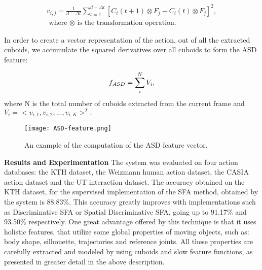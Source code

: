 \documentclass[11pt]{report}
\begin{document}
 \begin{equation}
 \begin{multlined}
 v_{i,j} = \frac{1}{d-\Delta t} \sum_{t = 1}^{d-\Delta t}[C_i(t+1) \otimes F_j - C_i(t) \otimes F_j]^2,\\ 
 \text{ where } \otimes \text{ is the transformation operation. } 
 \end{multlined}
 \end{equation}
 
In order to create a vector representation of the action, out of all the extracted cuboids, we accumulate the squared derivatives over all cuboids to form the ASD feature:

\begin{equation}
\mathnormal{f}_{ASD} = \sum_i^N V_i,
\end{equation}
where N is the total number of cuboids extracted from the current frame and \(V_i = <v_{i,1}, v_{i,2}, ..., v_{i,K}>^T.\)

\begin{figure}
    \centering
    \texttt{[image: ASD-feature.png]}
    \caption{An example of the computation of the ASD feature vector.} 
    \label{fig:ASD-feature}
\end{figure}

\textbf{Results and Experimentation}
The system was evaluated on four action databases: the KTH dataset, the Weizmann human action dataset, the CASIA action dataset and the UT interaction dataset. The accuracy obtained on the KTH dataset, for the supervised implementation of the SFA method, obtained by the system is 88.83\%. This accuracy greatly improves with implementations such as Discriminative SFA or Spatial Discriminative SFA, going up to 91.17\% and 93.50\% respectively. 
One great advantage offered by this technique is that it uses holistic features, that utilize some global properties of moving objects, such as: body shape, silhouette, trajectories and reference joints. All these properties are carefully extracted and modeled by using cuboids and slow feature functions, as presented in greater detail in the above description. 
\end{document}

